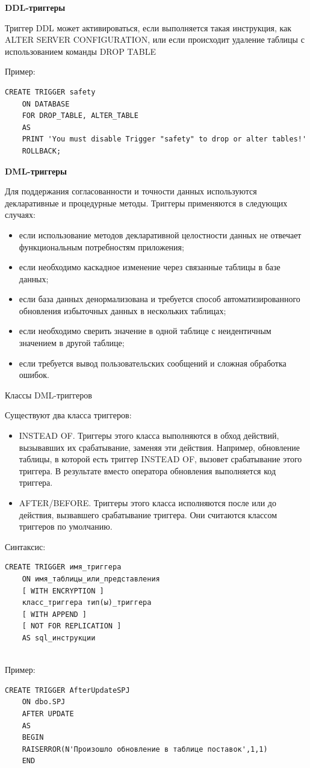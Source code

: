 \textbf{DDL-триггеры}

Триггер DDL может активироваться, если выполняется такая инструкция, как ALTER
SERVER CONFIGURATION, или если происходит удаление таблицы с использованием
команды DROP TABLE

Пример:
\begin{lstlisting}[label=trigexample]
	CREATE TRIGGER safety
	ON DATABASE
	FOR DROP_TABLE, ALTER_TABLE
	AS
	PRINT 'You must disable Trigger "safety" to drop or alter tables!'
	ROLLBACK;
\end{lstlisting}

\textbf{DML-триггеры}

Для поддержания согласованности и точности данных используются декларативные и
процедурные методы.
Триггеры применяются в следующих случаях:
\begin{itemize}
	\item если использование методов декларативной целостности данных не отвечает
	функциональным потребностям приложения;
	\item если необходимо каскадное изменение через связанные таблицы в базе данных;
	\item если база данных денормализована и требуется способ автоматизированного обновления
	избыточных данных в нескольких таблицах;
	\item если необходимо сверить значение в одной таблице с неидентичным значением в другой
	таблице;
	\item если требуется вывод пользовательских сообщений и сложная обработка ошибок.
\end{itemize}

Классы DML-триггеров

Существуют два класса триггеров:
\begin{itemize}
	\item INSTEAD OF. Триггеры этого класса выполняются в обход действий, вызывавших их
	срабатывание, заменяя эти действия. Например, обновление таблицы, в которой есть
	триггер INSTEAD OF, вызовет срабатывание этого триггера. В результате вместо оператора
	обновления выполняется код триггера.
	\item AFTER/BEFORE. Триггеры этого класса исполняются после или до действия, вызвавшего
	срабатывание триггера. Они считаются классом триггеров по умолчанию.
\end{itemize}

Синтаксис:
\begin{lstlisting}[label=dmlsint]
	CREATE TRIGGER имя_триггера
	ON имя_таблицы_или_представления
	[ WITH ENCRYPTION ]
	класс_триггера тип(ы)_триггера
	[ WITH APPEND ]
	[ NOT FOR REPLICATION ]
	AS sql_инструкции
	
\end{lstlisting}
Пример:
\begin{lstlisting}[label=dmlexample]
	CREATE TRIGGER AfterUpdateSPJ
	ON dbo.SPJ
	AFTER UPDATE
	AS
	BEGIN
	RAISERROR(N'Произошло обновление в таблице поставок',1,1)
	END 
\end{lstlisting}


